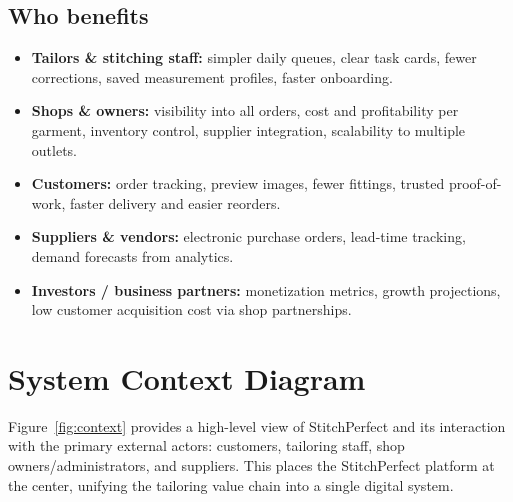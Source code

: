 \documentclass[11pt]{article}
\begin{document}
\subsection{Who benefits}
\begin{itemize}[leftmargin=1.5em]
  \item \textbf{Tailors \& stitching staff:} simpler daily queues, clear task cards, fewer
        corrections, saved measurement profiles, faster onboarding.
  \item \textbf{Shops \& owners:} visibility into all orders, cost and profitability per garment,
        inventory control, supplier integration, scalability to multiple outlets.
  \item \textbf{Customers:} order tracking, preview images, fewer fittings, trusted
        proof-of-work, faster delivery and easier reorders.
  \item \textbf{Suppliers \& vendors:} electronic purchase orders, lead-time tracking, demand
        forecasts from analytics.
  \item \textbf{Investors / business partners:} monetization metrics, growth projections, low
        customer acquisition cost via shop partnerships.
\end{itemize}

\section{System Context Diagram}
Figure~\ref{fig:context} provides a high-level view of StitchPerfect and its interaction with the
primary external actors: customers, tailoring staff, shop owners/administrators, and suppliers.
This places the StitchPerfect platform at the center, unifying the tailoring value chain into a
single digital system.
\end{document}
